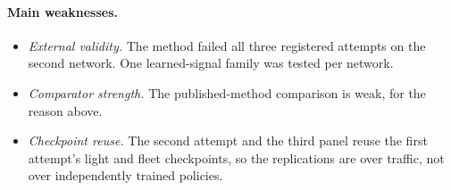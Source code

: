 \documentclass[11pt]{article}
\begin{document}
\paragraph{Main weaknesses.}
\begin{itemize}\setlength\itemsep{0pt}
\item \emph{External validity.} The method failed all three registered attempts on the second network. One learned-signal family was
tested per network.
\item \emph{Comparator strength.} The published-method comparison is weak, for the reason above.
\item \emph{Checkpoint reuse.} The second attempt and the third panel reuse the first attempt's light and fleet checkpoints, so the
replications are over traffic, not over independently trained policies.
\end{itemize}
\end{document}
